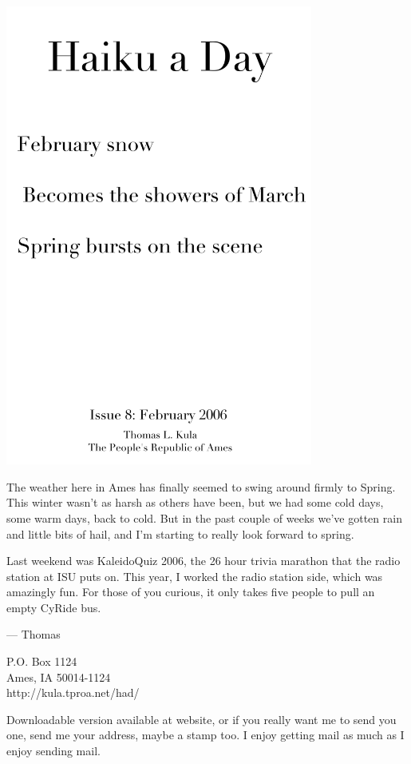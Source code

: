 \documentclass[12pt]{article}
\begin{document}
\includegraphics[width=101mm]{frontpage.png}

\newpage

The weather here in Ames has finally seemed to swing around firmly
to Spring. This winter wasn't as harsh as others have been, but
we had some cold days, some warm days, back to cold. But in the
past couple of weeks we've gotten rain and little bits of hail,
and I'm starting to really look forward to spring.

Last weekend was KaleidoQuiz 2006, the 26 hour trivia marathon that
the radio station at ISU puts on. This year, I worked the radio
station side, which was amazingly fun. For those of you curious,
it only takes five people to pull an empty CyRide bus.

--- Thomas

P.O. Box 1124 \\
Ames, IA 50014-1124 \\
http://kula.tproa.net/had/

Downloadable version available at website, or if you really
want me to send you one, send me your address, maybe a
stamp too. I enjoy getting mail as much as I enjoy sending
mail.\\
\end{document}
